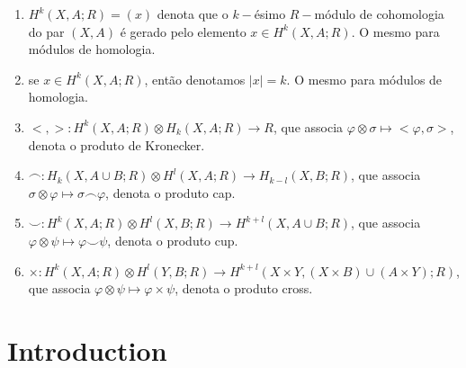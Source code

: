 \documentclass[12pt,oneside]{book}
\newcommand{\ccup}{\smile}
\newcommand{\ccap}{\frown}
\newcommand{\tensor}{\otimes}
\begin{document}
\begin{enumerate}
	\item $H^{k}(X,A;R)=(x)$ denota que o $k-$ésimo $R-$módulo de cohomologia do par $(X,A)$ é gerado pelo elemento $x\in H^{k}(X,A;R)$. O mesmo para módulos de homologia.
	\item se $x\in H^{k}(X,A;R)$, então denotamos $|x|=k$. O mesmo para módulos de homologia.
	\item $<,>:H^{k}(X,A;R)\tensor H_{k}(X,A;R)\to R$, que associa $\varphi\tensor\sigma\mapsto <\varphi,\sigma>$, denota o produto de Kronecker.
	\item $\ccap:H_{k}(X,A\cup B;R)\tensor H^{l}(X,A;R)\to H_{k-l}(X,B;R)$, que associa $\sigma\tensor\varphi\mapsto\sigma\ccap\varphi$, denota o produto cap.
	\item $\ccup:H^{k}(X,A;R)\tensor H^{l}(X,B;R)\to H^{k+l}(X,A\cup B;R)$, que associa $\varphi\tensor\psi\mapsto\varphi\ccup\psi$, denota o produto cup.
	\item $\times:H^{k}(X,A;R)\tensor H^{l}(Y,B;R)\to H^{k+l}(X\times Y,(X\times B)\cup(A\times Y);R)$, que associa $\varphi\tensor\psi\mapsto\varphi\times\psi$, denota o produto cross.
	\thispagestyle{empty}
\end{enumerate}



\chapter{Introduction}
\thispagestyle{empty}





    \newpage
    \thispagestyle{empty}
    \printindex
\end{document}

